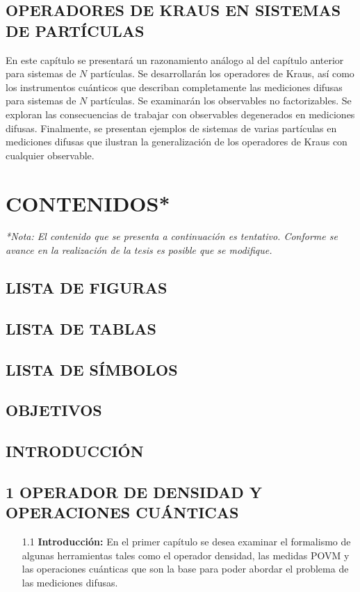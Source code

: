 \documentclass[12pt,oneside]{book}\raggedbottom{} %
\begin{document}
\begin{sloppypar}
{{\section{OPERADORES DE KRAUS EN SISTEMAS DE \texorpdfstring{}{N} PARTÍCULAS}

En este capítulo se presentará un razonamiento análogo al del capítulo
anterior para sistemas de $N$ partículas. Se  desarrollarán los operadores de
Kraus, así como los instrumentos cuánticos que describan completamente las
mediciones difusas para sistemas de $N$ partículas. Se examinarán los
observables no factorizables. Se exploran las consecuencias de trabajar con
observables degenerados en mediciones difusas.  Finalmente, se presentan
ejemplos de sistemas de varias partículas en mediciones difusas que ilustran la
generalización de los operadores de Kraus con cualquier observable.  

\chapter{CONTENIDOS*} %
\textit{*Nota: El contenido que se presenta a continuación es tentativo. Conforme se avance en la realización de la tesis es posible que se modifique.}


\section*{LISTA DE FIGURAS}

\section*{LISTA DE TABLAS}

\section*{LISTA DE SÍMBOLOS}

\section*{OBJETIVOS}

\section*{INTRODUCCIÓN}

\section*{1 OPERADOR DE DENSIDAD Y OPERACIONES CUÁNTICAS}
\begin{itemize}
\item[1.1]\textbf{Introducción:}
En el primer capítulo se desea examinar el formalismo de algunas herramientas tales como el operador densidad, las medidas POVM y las operaciones  cuánticas que son la base para poder abordar el problema de las mediciones difusas. 


\end{itemize}}}
\end{sloppypar}
\end{document}
